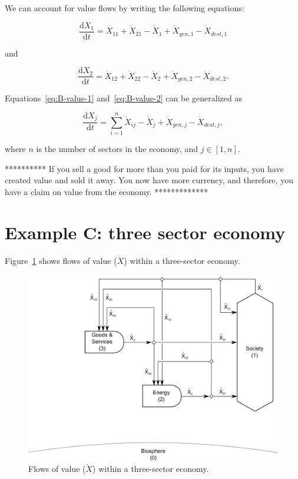 We can account for value flows by writing
the following equations:

\begin{equation}\label{eq:B-value-1}
	\frac{\mathrm{d}X_{1}}{\mathrm{d}t}
	= \dot{X}_{11}
	+ \dot{X}_{21}
	- \dot{X}_{1}
	+ \dot{X}_{gen,1}
	- \dot{X}_{dest,1}
\end{equation}

\noindent{}and

\begin{equation}\label{eq:B-value-2}
	\frac{\mathrm{d}X_{2}}{\mathrm{d}t}
	= \dot{X}_{12}
	+ \dot{X}_{22}
	- \dot{X}_{2}
	+ \dot{X}_{gen,2}
	- \dot{X}_{dest,2}.
\end{equation}

Equations~\ref{eq:B-value-1} and~\ref{eq:B-value-2}
can be generalized as

\begin{equation}\label{eq:B-value-generalized}
	\frac{\mathrm{d}X_{j}}{\mathrm{d}t}
	= \sum\limits_{i=1}^n \dot{X}_{ij}
	- \dot{X}_{j}
	+ \dot{X}_{gen,j}
	- \dot{X}_{dest,j},
\end{equation}

\noindent{}where $n$ is the number of sectors in the economy, and $j \in [1, n]$.





**********
If you sell a good for more than you paid for its inputs, 
you have created value and sold it away. 
You now have more currency, and therefore, 
you have a claim on value from the economy.
*************




\section{Example C: three sector economy}

Figure~\ref{fig:C_value} shows flows of value ($\dot{X}$) 
within a three-sector economy. 

\begin{figure}[!ht]
\centering
\includegraphics[width=0.8\linewidth]{Part_3/Chapter_Values/images/3_sector_value.pdf}
\caption[Flows of value within a three-sector economy.]{Flows of value ($\dot{X}$) within a three-sector economy.}
\label{fig:C_value}
\end{figure}


